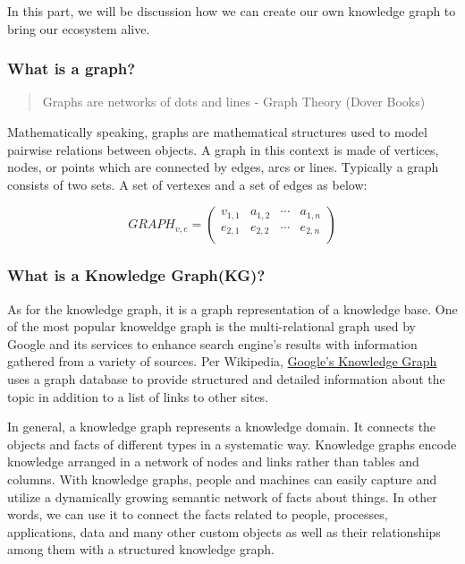 \documentclass{acm_proc_article-sp}
\begin{document}
In this part, we will be discussion how we can create our own knowledge
graph to bring our ecosystem alive.

\subsubsection{What is a graph?}\label{what-is-a-graph}

\begin{quote}
Graphs are networks of dots and lines - Graph Theory (Dover Books)
\end{quote}

Mathematically speaking, graphs are mathematical structures used to
model pairwise relations between objects. A graph in this context is
made of vertices, nodes, or points which are connected by edges, arcs or
lines. Typically a graph consists of two sets. A set of vertexes and a
set of edges as below:

\[GRAPH_{v,e} =
 \begin{pmatrix}
  v_{1,1} & a_{1,2} & \cdots & a_{1,n} \\
  e_{2,1} & e_{2,2} & \cdots & e_{2,n} \\
 \end{pmatrix}\]

\subsubsection{What is a Knowledge
Graph(KG)?}\label{what-is-a-knowledge-graphkg}

As for the knowledge graph, it is a graph representation of a knowledge
base. One of the most popular knoweldge graph is the multi-relational
graph used by Google and its services to enhance search engine's results
with information gathered from a variety of sources. Per Wikipedia,
\href{https://developers.google.com/knowledge-graph/\#knowledge_graph_entities}{Google's
Knowledge Graph} uses a graph database to provide structured and
detailed information about the topic in addition to a list of links to
other sites.

In general, a knowledge graph represents a knowledge domain. It connects
the objects and facts of different types in a systematic way. Knowledge
graphs encode knowledge arranged in a network of nodes and links rather
than tables and columns. With knowledge graphs, people and machines can
easily capture and utilize a dynamically growing semantic network of
facts about things. In other words, we can use it to connect the facts
related to people, processes, applications, data and many other custom
objects as well as their relationships among them with a structured
knowledge graph.
\end{document}

